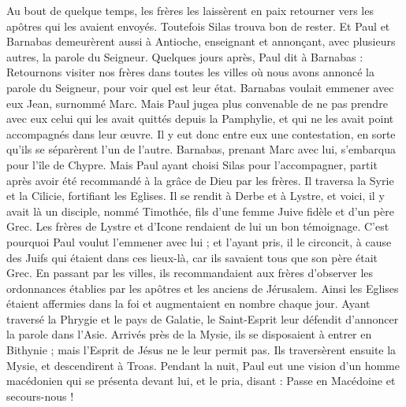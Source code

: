 \begin{multicols}{2}
Au bout de quelque temps, les frères les laissèrent en paix retourner vers les apôtres qui les avaient envoyés.
Toutefois Silas trouva bon de rester.
Et Paul et Barnabas demeurèrent aussi à Antioche, enseignant et annonçant, avec plusieurs autres, la parole du Seigneur.
Quelques jours après, Paul dit à Barnabas : Retournons visiter nos frères dans toutes les villes où nous avons annoncé la parole du Seigneur, pour voir quel est leur état.
Barnabas voulait emmener avec eux Jean, surnommé Marc.
Mais Paul jugea plus convenable de ne pas prendre avec eux celui qui les avait quittés depuis la Pamphylie, et qui ne les avait point accompagnés dans leur œuvre.
Il y eut donc entre eux une contestation, en sorte qu’ils se séparèrent l’un de l’autre. Barnabas, prenant Marc avec lui, s’embarqua pour l’île de Chypre.
Mais Paul ayant choisi Silas pour l'accompagner, partit après avoir été recommandé à la grâce de Dieu par les frères.
Il traversa la Syrie et la Cilicie, fortifiant les Eglises.
\VerseOne{}Il se rendit à Derbe et à Lystre, et voici, il y avait là un disciple, nommé Timothée, fils d'une femme Juive fidèle et d'un père Grec.
Les frères de Lystre et d’Icone rendaient de lui un bon témoignage.
C'est pourquoi Paul voulut l’emmener avec lui ; et l'ayant pris, il le circoncit, à cause des Juifs qui étaient dans ces lieux-là, car ils savaient tous que son père était Grec.
En passant par les villes, ils recommandaient aux frères d’observer les ordonnances établies par les apôtres et les anciens de Jérusalem.
Ainsi les Eglises étaient affermies dans la foi et augmentaient en nombre chaque jour.
Ayant traversé la Phrygie et le pays de Galatie, le Saint-Esprit leur défendit d'annoncer la parole dans l’Asie.
Arrivés près de la Mysie, ils se disposaient à entrer en Bithynie ; mais l'Esprit de Jésus ne le leur permit pas.
Ils traversèrent ensuite la Mysie, et descendirent à Troas.
Pendant la nuit, Paul eut une vision d’un homme macédonien qui se présenta devant lui, et le pria, disant : Passe en Macédoine et secours-nous !

\end{multicols}
